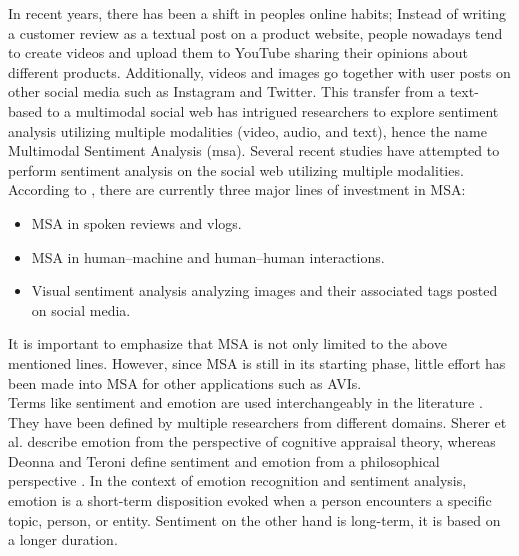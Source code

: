 In recent years, there has been a shift in peoples online habits; Instead of writing a customer review as a textual post on a product website, people nowadays tend to create videos and upload them to YouTube sharing their opinions about different products. Additionally, videos and images go together with user posts on other social media such as Instagram and Twitter. This transfer from a text-based to a multimodal social web has intrigued researchers to explore sentiment analysis utilizing multiple modalities (video, audio, and text), hence the name Multimodal Sentiment Analysis (\acrshort{msa}). Several recent studies have attempted to perform sentiment analysis on the social web utilizing multiple modalities. According to \cite{MSA_review1_SOLEYMANI20173}, there are currently three major lines of investment in MSA: 
%
\begin{itemize}
    \item MSA in spoken reviews and vlogs. \\
    \item MSA in human–machine and human–human interactions. \\
    \item Visual sentiment analysis analyzing images and their associated tags posted on social media.
\end{itemize}
%
\indent It is important to emphasize that MSA is not only limited to the above mentioned lines. However, since MSA is still in its starting phase, little effort has been made into MSA for other applications such as AVIs. \\

Terms like sentiment and emotion are used interchangeably in the literature \cite{sentiment_emotion_difference_munezero2014they} \cite{HP_RPP} \cite{HP_Advanced}. They have been defined by multiple researchers from different domains. Sherer et al. \cite{scherer2005emotions} describe emotion from the perspective of cognitive appraisal theory, whereas Deonna and Teroni \cite{deonna2012emotions} define sentiment and emotion from a philosophical perspective \cite{MSA_review1_SOLEYMANI20173}. In the context of emotion recognition and sentiment analysis, emotion is a short-term disposition evoked when a person encounters a specific topic, person, or entity. Sentiment on the other hand is long-term, it is based on a longer duration.  \\


